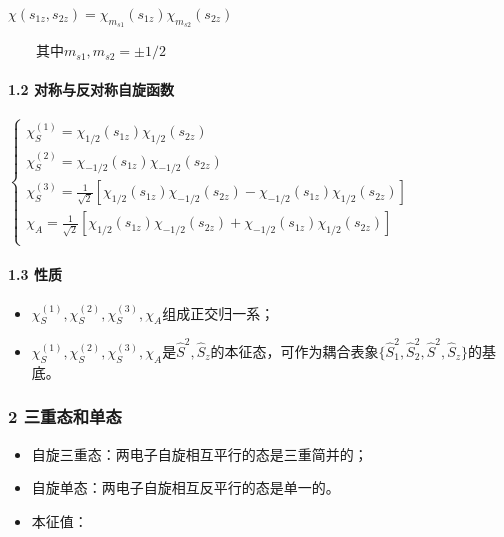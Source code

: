 \documentclass[UTF8,twocolumn]{ctexart}
\providecommand{\tightlist}{%
  \setlength{\itemsep}{0pt}\setlength{\parskip}{0pt}}
\let\oldparagraph\paragraph
\renewcommand{\paragraph}[1]{\oldparagraph{#1}\mbox{}}
\begin{document}
\begin{center}
\(\chi(s_{1z},s_{2z})=\chi_{m_{s1}}(s_{1z})\chi_{m_{s2}}(s_{2z})\)
\end{center}
  其中\(m_{s1},m_{s2}=\pm1/2\)

\hypertarget{ux5bf9ux79f0ux4e0eux53cdux5bf9ux79f0ux81eaux65cbux51fdux6570}{%
\paragraph{ 1.2
对称与反对称自旋函数}\label{ux5bf9ux79f0ux4e0eux53cdux5bf9ux79f0ux81eaux65cbux51fdux6570}}

\begin{center}
\(\begin{cases}
    \chi_S^{(1)}=\chi_{1/2}(s_{1z})\chi_{1/2}(s_{2z}) \\
    \chi_S^{(2)}=\chi_{-1/2}(s_{1z})\chi_{-1/2}(s_{2z}) \\
    \chi_S^{(3)}=\frac{1}{\sqrt{2}}[\chi_{1/2}(s_{1z})\chi_{-1/2}(s_{2z})-\chi_{-1/2}(s_{1z})\chi_{1/2}(s_{2z})] \\
    \chi_A=\frac{1}{\sqrt{2}}[\chi_{1/2}(s_{1z})\chi_{-1/2}(s_{2z})+\chi_{-1/2}(s_{1z})\chi_{1/2}(s_{2z})] \\
\end{cases}\)
\end{center}

\hypertarget{ux6027ux8d28}{%
\paragraph{ 1.3 性质}\label{ux6027ux8d28}}

\begin{itemize}
\tightlist
\item
  \(\chi_S^{(1)},\chi_S^{(2)},\chi_S^{(3)},\chi_A\)组成正交归一系；
\item
  \(\chi_S^{(1)},\chi_S^{(2)},\chi_S^{(3)},\chi_A\)是\(\hat{S}^2,\hat{S}_z\)的本征态，可作为耦合表象\(\{\hat{S}_1^2,\hat{S}_2^2,\hat{S}^2,\hat{S}_z\}\)的基底。
\end{itemize}

\hypertarget{ux4e09ux91cdux6001ux548cux5355ux6001}{%
\subsubsection{2
三重态和单态}\label{ux4e09ux91cdux6001ux548cux5355ux6001}}

\begin{itemize}
\tightlist
\item
  自旋三重态：两电子自旋相互平行的态是三重简并的；
\item
  自旋单态：两电子自旋相互反平行的态是单一的。
\item
  本征值：
\end{itemize}
\end{document}
